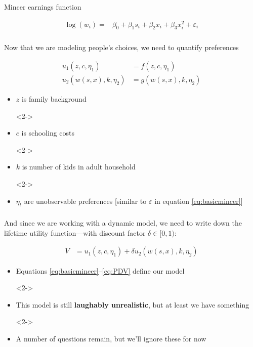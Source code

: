 \documentclass[aspectratio=169]{beamer}
\begin{document}
\begin{frame}\frametitle{}
Mincer earnings function

\begin{align}
\log(w_{i}) =& \beta_0 + \beta_1 s_{i} + \beta_2 x_{i} + \beta_3 x^2_{i} + \varepsilon_{i}
\label{eq:basicmincer}
\end{align}

\end{frame}



\begin{frame}\frametitle{}
Now that we are modeling people's choices, we need to quantify preferences

\begin{align}
u_1\left(z,c,\eta_1\right) & = f\left(z,c,\eta_1\right) \nonumber \\
u_2\left(w\left(s,x\right),k,\eta_2\right) & = g\left(w\left(s,x\right),k,\eta_2\right)
\label{eq:utils}
\end{align}

\begin{itemize}
    \item<2-> $z$ is family background
    \item[]<2->
    \item<2-> $c$ is schooling costs
    \item[]<2->
    \item<2-> $k$ is number of kids in adult household
    \item[]<2->
    \item<2-> $\eta_t$ are unobservable preferences [similar to $\varepsilon$ in equation \eqref{eq:basicmincer}]
\end{itemize}

\end{frame}

\begin{frame}\frametitle{}
And since we are working with a dynamic model, we need to write down the lifetime utility function---with discount factor $\delta \in [0,1)$:

\begin{align}
V & = u_1\left(z,c,\eta_1\right) + \delta u_2\left(w\left(s,x\right),k,\eta_2\right)
\label{eq:PDV}
\end{align}

\begin{itemize}
    \item<2-> Equations \eqref{eq:basicmincer}--\eqref{eq:PDV} define our model
    \item[]<2->
    \item<2-> This model is still \textbf{laughably unrealistic}, but at least we have something
    \item[]<2->
    \item<2-> A number of questions remain, but we'll ignore these for now
\end{itemize}

\end{frame}
\end{document}
